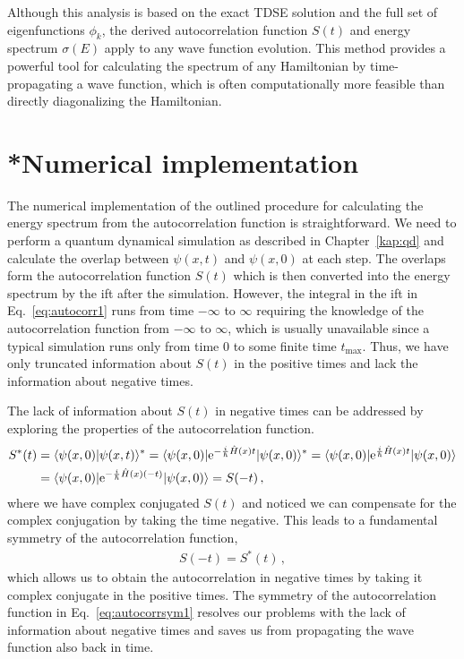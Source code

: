 Although this analysis is based on the exact TDSE solution and the full set of eigenfunctions $\phi_k$, the derived autocorrelation function $S(t)$ and energy spectrum $\sigma(E)$ apply to any wave function evolution. This method provides a powerful tool for calculating the spectrum of any Hamiltonian by time-propagating a wave function, which is often computationally more feasible than directly diagonalizing the Hamiltonian.

\section{*Numerical implementation}
\label{sec:autocorr_numap}

The numerical implementation of the outlined procedure for calculating the energy spectrum from the autocorrelation function is straightforward. We need to perform a quantum dynamical simulation as described in Chapter~\ref{kap:qd} and calculate the overlap between $\psi(x,t)$ and $\psi(x,0)$ at each step. The overlaps form the autocorrelation function $S(t)$ which is then converted into the energy spectrum by the \acrlong{ift} after the simulation. However, the integral in the \acrlong{ift} in Eq.~\eqref{eq:autocorr1} runs from time $-\infty$ to $\infty$ requiring the knowledge of the autocorrelation function from $-\infty$ to $\infty$, which is usually unavailable since a typical simulation runs only from time 0 to some finite time $t_\mathrm{max}$. Thus, we have only truncated information about $S(t)$ in the positive times and lack the information about negative times.

The lack of information about $S(t)$ in negative times can be addressed by exploring the properties of the autocorrelation function.
\begin{align}
    S^*(t) &= \langle \psi(x,0) | \psi(x,t) \rangle^* = \langle \psi(x,0) | \mathrm{e}^{-\frac{i}{\hbar}\hat{H}(x)t} |\psi(x,0) \rangle^* = \langle \psi(x,0) | \mathrm{e}^{\frac{i}{\hbar}\hat{H}(x)t} |\psi(x,0) \rangle \notag \\
    &= \langle \psi(x,0) | \mathrm{e}^{-\frac{i}{\hbar}\hat{H}(x)(-t)} |\psi(x,0) \rangle = S(-t) \, ,
    \label{eq:autocorrsym2}
\end{align}
where we have complex conjugated $S(t)$ and noticed we can compensate for the complex conjugation by taking the time negative. This leads to a fundamental symmetry of the autocorrelation function,
\begin{align}
    S(-t) = S^*(t) \, ,
    \label{eq:autocorrsym1}
\end{align}
which allows us to obtain the autocorrelation in negative times by taking it complex conjugate in the positive times. The symmetry of the autocorrelation function in Eq.~\eqref{eq:autocorrsym1} resolves our problems with the lack of information about negative times and saves us from propagating the wave function also back in time.


